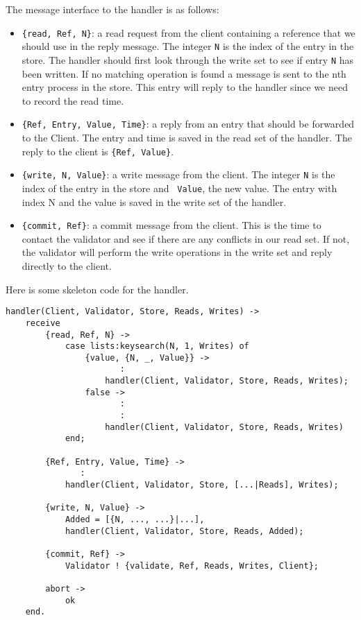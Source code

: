 \documentclass[a4paper, 11pt]{article}
\begin{document}
The message interface to the handler is as follows:

\begin{itemize}

\item {\tt \{read, Ref, N\}}: a read request from the client
  containing a reference that we should use in the reply message. The
  integer {\tt N} is the index of the entry in the store. The handler
  should first look through the write set to see if entry
  {\tt N} has been written. If no matching operation is found a
  message is sent to the nth entry process in the store. This entry
  will reply to the handler since we need to record the read time. 

\item {\tt \{Ref, Entry, Value, Time\}}: a reply from an entry that
  should be forwarded to the Client. The entry and time is saved in
  the read set of the handler. The reply to the client is {\tt \{Ref, Value\}}.

\item {\tt \{write, N, Value\}}: a write message from the client.  The
  integer {\tt N} is the index of the entry in the store and {\tt
    Value}, the new value. The entry with index N and the value is
  saved in the write set of the handler.

\item {\tt \{commit, Ref\}}: a commit message from the client. This is
  the time to contact the validator and see if there are any conflicts
  in our read set. If not, the validator will perform the
  write operations in the write set and reply directly to the client.
\end{itemize}

\noindent Here is some skeleton code for the handler.

\begin{verbatim}
handler(Client, Validator, Store, Reads, Writes) ->         
    receive
        {read, Ref, N} ->
            case lists:keysearch(N, 1, Writes) of
                {value, {N, _, Value}} ->
                       :
                    handler(Client, Validator, Store, Reads, Writes);
                false ->
                       :
                       :
                    handler(Client, Validator, Store, Reads, Writes)
            end;

        {Ref, Entry, Value, Time} ->
               :
            handler(Client, Validator, Store, [...|Reads], Writes);

        {write, N, Value} ->
            Added = [{N, ..., ...}|...],
            handler(Client, Validator, Store, Reads, Added);

        {commit, Ref} ->
            Validator ! {validate, Ref, Reads, Writes, Client};

        abort ->
            ok
    end.
\end{verbatim}
\end{document}
